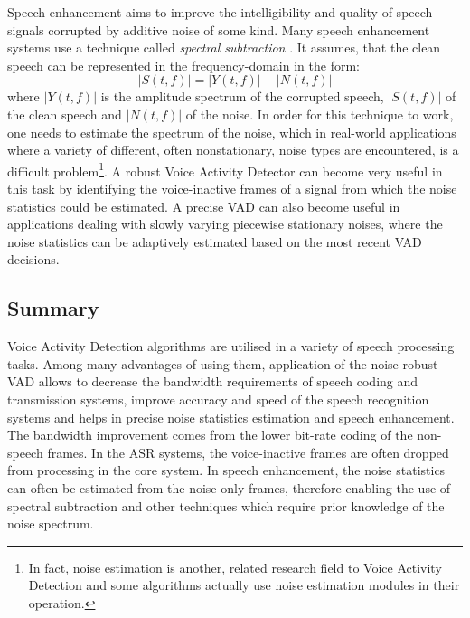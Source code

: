 Speech enhancement aims to improve the intelligibility and quality of speech signals corrupted by additive  noise of some kind. Many speech enhancement systems use a technique called \emph{spectral subtraction} \cite{Kondoz, RamirezGorriz}. It assumes, that the clean speech can be represented in the frequency-domain in the form:
\begin{equation}
|S(t,f)| = |Y(t,f)| - |N(t,f)|
\end{equation}
where $|Y(t,f)|$ is the amplitude spectrum of the corrupted speech, $|S(t,f)|$ of the clean speech and $|N(t,f)|$ of the noise. In order for this technique to work, one needs to estimate the spectrum of the noise, which in real-world applications where a variety of different, often nonstationary, noise types are encountered, is a difficult problem\footnote{In fact, noise estimation is another, related research field to Voice Activity Detection and some algorithms actually use noise estimation modules in their operation.}. A robust Voice Activity Detector can become very useful in this task by identifying the voice-inactive frames of a signal from which the noise statistics could be estimated. A precise VAD can also become useful in applications dealing with slowly varying piecewise stationary noises, where the noise statistics can be adaptively estimated based on the most recent VAD decisions.

\subsection{Summary}

Voice Activity Detection algorithms are utilised in a variety of speech processing tasks. Among many advantages of using them, application of the noise-robust VAD allows to decrease the bandwidth requirements of speech coding and transmission systems, improve accuracy and speed of the speech recognition systems and helps in precise noise statistics estimation and speech enhancement. The bandwidth improvement comes from the lower bit-rate coding of the non-speech frames. In the ASR systems, the voice-inactive frames are often dropped from processing in the core system. In speech enhancement, the noise statistics can often be estimated from the noise-only frames, therefore enabling the use of spectral subtraction and other techniques which require prior knowledge of the noise spectrum.


